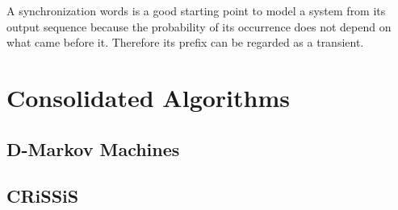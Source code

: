 {A synchronization words is a good starting point to model a system from its output sequence because the probability of its occurrence does not depend on what came before it. Therefore its prefix can be regarded as a transient.

\section{Consolidated Algorithms}

\subsection{D-Markov Machines}

\subsection{CRiSSiS}

}
